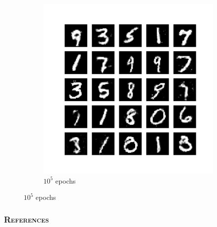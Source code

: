 \documentclass{beamer}
\begin{document}
\begin{frame}
\begin{figure}[H]
\begin{center}
\begin{subfigure}{0.45\textwidth}
					\includegraphics[scale = 0.23, trim = {3cm 3cm 3cm 3cm},clip]{regenerated_mnist_data_100000.pdf}
					\caption{$10^{5}$ epochs} 
				\end{subfigure}
			\end{center}
		\end{figure}
	\end{frame}
	
	\begin{frame}%
		\frametitle{\textsc{References}}
		\nocite{*} 
		
		
	\end{frame}
\end{document}

